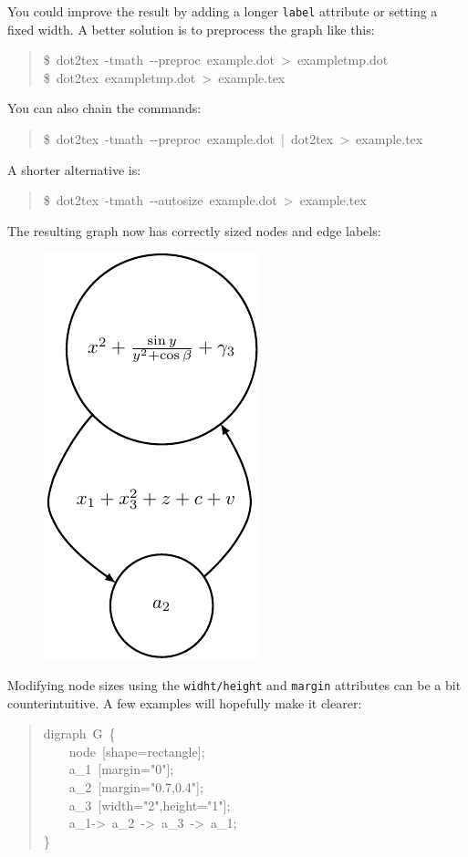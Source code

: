 \documentclass[10pt,a4paper,english]{article}
\begin{document}
You could improve the result by adding a longer \texttt{label} attribute or setting a fixed width. A better solution is to preprocess the graph like this:
\begin{quote}{\ttfamily \raggedright \noindent
{\$}~dot2tex~-tmath~-{}-preproc~example.dot~>~exampletmp.dot~\\
{\$}~dot2tex~exampletmp.dot~>~example.tex
}\end{quote}

You can also chain the commands:
\begin{quote}{\ttfamily \raggedright \noindent
{\$}~dot2tex~-tmath~-{}-preproc~example.dot~|~dot2tex~>~example.tex
}\end{quote}

A shorter alternative is:
\begin{quote}{\ttfamily \raggedright \noindent
{\$}~dot2tex~-tmath~-{}-autosize~example.dot~>~example.tex
}\end{quote}

The resulting graph now has correctly sized nodes and edge labels:
\begin{figure}[H]
\centering

\includegraphics{pdf/preproc1b}
\end{figure}

Modifying node sizes using the \texttt{widht/height} and \texttt{margin} attributes can be a bit counterintuitive. A few examples will hopefully make it clearer:
\begin{quote}{\ttfamily \raggedright \noindent
digraph~G~{\{}~\\
~~~~node~{[}shape=rectangle{]};~\\
~~~~a{\_}1~{[}margin="0"{]};~\\
~~~~a{\_}2~{[}margin="0.7,0.4"{]};~\\
~~~~a{\_}3~{[}width="2",height="1"{]};~\\
~~~~a{\_}1->~a{\_}2~->~a{\_}3~->~a{\_}1;~\\
{\}}
}\end{quote}
\end{document}
